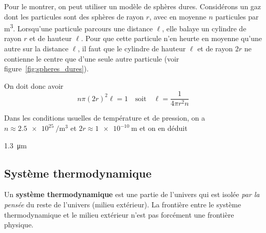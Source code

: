 \documentclass{cours}
\begin{document}
Pour le montrer, on peut utiliser un modèle de sphères dures. Considérons un gaz dont les particules sont des sphères de rayon $r$, avec en moyenne $n$ particules par \si{\cubic\meter}. Lorsqu'une particule parcours une distance $\ell$, elle balaye un cylindre de rayon $r$ et de hauteur $\ell$. Pour que cette particule n'en heurte en moyenne qu'une autre sur la distance $\ell$, il faut que le cylindre de hauteur $\ell$ et de rayon $2r$ ne contienne le centre que d'une seule autre particule (voir figure~\ref{fig:spheres_dures}).
\begin{center}
\end{center}

On doit donc avoir 
\begin{equation}
  n\pi(2r)^2\ell = 1 \quad \text{soit} \quad \ell = \frac{1}{4\pi r^2 n}
\end{equation}

Dans les conditions usuelles de température et de pression, on a $n\approx \SI{2.5e25}{\per\cubic\meter}$ et $2r\approx \SI{1e-10}{\m}$ et on en déduit 
\begin{eqencadre}
  \ell \approx \SI{1.3}{\micro\meter} 
\end{eqencadre}



\subsection{Système thermodynamique}%
\label{sub:systeme_thermodynamique}
Un \textbf{système thermodynamique} est une partie de l'univers qui est isolée \emph{par la pensée} du reste de l'univers (milieu extérieur). La frontière entre le système thermodynamique et le milieu extérieur n'est pas forcément une frontière physique.
\end{document}
